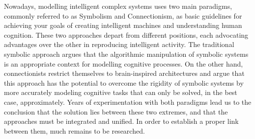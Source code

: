 Nowadays, modelling intelligent complex systems uses two main paradigms, commonly referred to as Symbolism and Connectionism, as basic guidelines for achieving your goals of creating intelligent machines and understanding human cognition. These two approaches depart from different positions, each advocating advantages over the other in reproducing intelligent activity. The traditional symbolic approach argues that the algorithmic manipulation of symbolic systems is an appropriate context for modelling cognitive processes. On the other hand, connectionists restrict themselves to brain-inspired architectures and argue that this approach has the potential to overcome the rigidity of symbolic systems by more accurately modeling cognitive tasks that can only be solved, in the best case, approximately. Years of experimentation with both paradigms lead us to the conclusion that the solution lies between these two extremes, and that the approaches must be integrated and unified. In order to establish a proper link between them, much remains to be researched.
